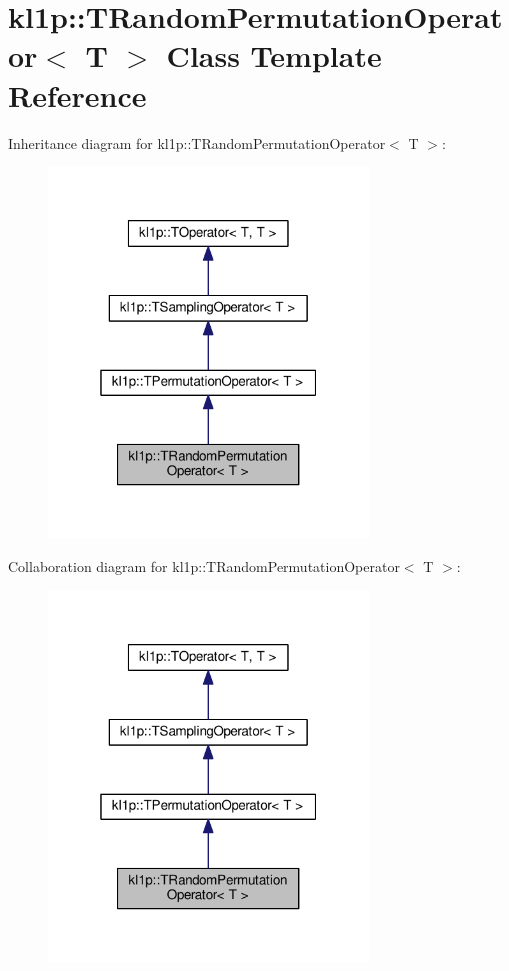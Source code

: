 \hypertarget{classkl1p_1_1TRandomPermutationOperator}{}\section{kl1p\+:\+:T\+Random\+Permutation\+Operator$<$ T $>$ Class Template Reference}
\label{classkl1p_1_1TRandomPermutationOperator}


Inheritance diagram for kl1p\+:\+:T\+Random\+Permutation\+Operator$<$ T $>$\+:
\nopagebreak
\begin{figure}[H]
\begin{center}
\leavevmode
\includegraphics[width=241pt]{classkl1p_1_1TRandomPermutationOperator__inherit__graph}
\end{center}
\end{figure}


Collaboration diagram for kl1p\+:\+:T\+Random\+Permutation\+Operator$<$ T $>$\+:
\nopagebreak
\begin{figure}[H]
\begin{center}
\leavevmode
\includegraphics[width=241pt]{classkl1p_1_1TRandomPermutationOperator__coll__graph}
\end{center}
\end{figure}
